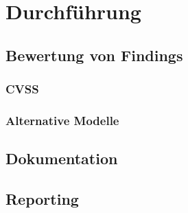 	\section{Durchführung}
		\subsection{Bewertung von Findings}
			\subsubsection{CVSS}
			\subsubsection{Alternative Modelle}
		\subsection{Dokumentation}	            	
            	\subsection{Reporting}    